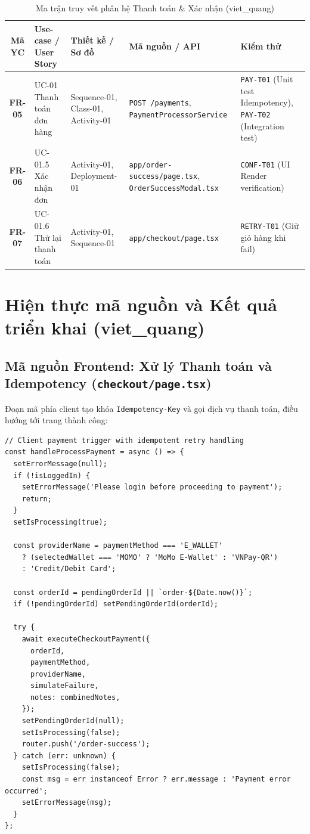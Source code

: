\documentclass[a4paper]{article}
\begin{document}
\begin{table}[h!]
\centering
\small
\begin{tabular}{|c|l|l|l|l|}
\hline
\textbf{Mã YC} & \textbf{Use-case / User Story} & \textbf{Thiết kế / Sơ đồ} & \textbf{Mã nguồn / API} & \textbf{Kiểm thử} \\ \hline
\textbf{FR-05} & UC-01 Thanh toán đơn hàng & Sequence-01, Class-01, Activity-01 & \texttt{POST /payments}, \newline \texttt{PaymentProcessorService} & \texttt{PAY-T01} (Unit test Idempotency), \newline \texttt{PAY-T02} (Integration test) \\ \hline
\textbf{FR-06} & UC-01.5 Xác nhận đơn & Activity-01, Deployment-01 & \texttt{app/order-success/page.tsx}, \newline \texttt{OrderSuccessModal.tsx} & \texttt{CONF-T01} (UI Render verification) \\ \hline
\textbf{FR-07} & UC-01.6 Thử lại thanh toán & Activity-01, Sequence-01 & \texttt{app/checkout/page.tsx} & \texttt{RETRY-T01} (Giữ giỏ hàng khi fail) \\ \hline
\end{tabular}
\caption{Ma trận truy vết phân hệ Thanh toán \& Xác nhận (viet\_quang)}
\end{table}

\section{Hiện thực mã nguồn và Kết quả triển khai (viet\_quang)}

\subsection{Mã nguồn Frontend: Xử lý Thanh toán và Idempotency (\texttt{checkout/page.tsx})}
Đoạn mã phía client tạo khóa \texttt{Idempotency-Key} và gọi dịch vụ thanh toán, điều hướng tới trang thành công:

\begin{lstlisting}[caption={Client Checkout Payment Handler with Idempotency Key}]
// Client payment trigger with idempotent retry handling
const handleProcessPayment = async () => {
  setErrorMessage(null);
  if (!isLoggedIn) {
    setErrorMessage('Please login before proceeding to payment');
    return;
  }
  setIsProcessing(true);
  
  const providerName = paymentMethod === 'E_WALLET' 
    ? (selectedWallet === 'MOMO' ? 'MoMo E-Wallet' : 'VNPay-QR')
    : 'Credit/Debit Card';

  const orderId = pendingOrderId || `order-${Date.now()}`;
  if (!pendingOrderId) setPendingOrderId(orderId);

  try {
    await executeCheckoutPayment({
      orderId,
      paymentMethod,
      providerName,
      simulateFailure,
      notes: combinedNotes,
    });
    setPendingOrderId(null);
    setIsProcessing(false);
    router.push('/order-success');
  } catch (err: unknown) {
    setIsProcessing(false);
    const msg = err instanceof Error ? err.message : 'Payment error occurred';
    setErrorMessage(msg);
  }
};
\end{lstlisting}
\end{document}
